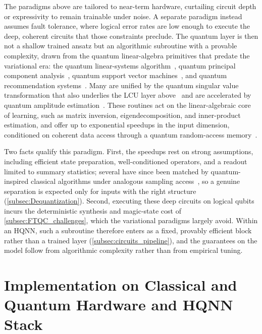 \documentclass[aps,10pt,groupedaddress,prx,superscriptaddress,twocolumn,balancelastpage, tightenlines]{revtex4-2}
\theoremstyle{plain}  %
\begin{document}
The paradigms above are tailored to near-term hardware, curtailing circuit depth or expressivity to remain trainable under noise. A separate paradigm instead assumes fault tolerance, where logical error rates are low enough to execute the deep, coherent circuits that those constraints preclude. The quantum layer is then not a shallow trained ansatz but an algorithmic subroutine with a provable complexity, drawn from the quantum linear-algebra primitives that predate the variational era: the quantum linear-systems algorithm~\cite{harrow_quantum_2009}, quantum principal component analysis~\cite{Lloyd2014QuantumUnsupervised}, quantum support vector machines~\cite{rebentrost_quantum_2014}, and quantum recommendation systems~\cite{kerenidis_recommendation_2017}. Many are unified by the quantum singular value transformation that also underlies the \gls{LCU} layer above~\cite{gilyen2019quantum} and are accelerated by quantum amplitude estimation~\cite{brassard_quantum_2002}. These routines act on the linear-algebraic core of learning, such as matrix inversion, eigendecomposition, and inner-product estimation, and offer up to exponential speedups in the input dimension, conditioned on coherent data access through a quantum random-access memory~\cite{giovannetti_quantum_2008}.

Two facts qualify this paradigm. First, the speedups rest on strong assumptions, including efficient state preparation, well-conditioned operators, and a readout limited to summary statistics; several have since been matched by quantum-inspired classical algorithms under analogous sampling access~\cite{tang_quantum_2021, chia_sampling-based_2020}, so a genuine separation is expected only for inputs with the right structure (\autoref{subsec:Dequantization}). Second, executing these deep circuits on logical qubits incurs the deterministic synthesis and magic-state cost of \autoref{subsec:FTQC_challenges}, which the variational paradigms largely avoid. Within an \gls{HQNN}, such a subroutine therefore enters as a fixed, provably efficient block rather than a trained layer (\autoref{subsec:circuits_pipeline}), and the guarantees on the model follow from algorithmic complexity rather than from empirical tuning.


\section{Implementation on Classical and Quantum Hardware and HQNN Stack}
\label{sec:implementation}
\end{document}
